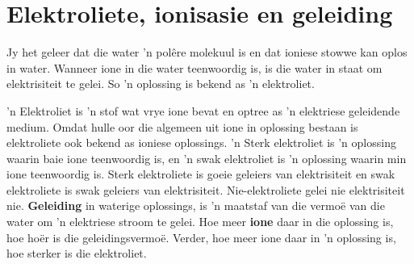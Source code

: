     \label{m38720*cid7}
            \section{Elektroliete, ionisasie en geleiding}
            \nopagebreak
      \label{m38720*id338608}Jy het geleer dat die water 'n polêre molekuul is en dat ioniese stowwe kan oplos in water.
Wanneer ione in die water teenwoordig is, is die water in staat om elektrisiteit te gelei. So  'n oplossing is bekend as 'n elektroliet.\par 
\label{m38720*fhsst!!!underscore!!!id635}
 { 'n Elektroliet is 'n stof wat vrye ione bevat en optree as 'n elektriese geleidende medium. Omdat hulle oor die algemeen uit ione in oplossing bestaan is elektroliete ook bekend as ioniese oplossings.  } 
 'n Sterk elektroliet is  'n oplossing waarin baie ione teenwoordig is, en 'n swak elektroliet is  'n oplossing waarin min ione teenwoordig is. Sterk elektroliete is goeie geleiers van elektrisiteit en swak elektroliete is swak geleiers van elektrisiteit. Nie-elektroliete gelei nie elektrisiteit nie.
\textbf{Geleiding} in waterige oplossings, is 'n maatstaf van die vermoë van die water om  'n elektriese stroom te gelei. Hoe meer \textbf{ione} daar in die oplossing is, hoe hoër is die geleidingsvermoë.  Verder, hoe meer ione daar in 'n oplossing is, hoe sterker is die elektroliet. 
      \label{m38720*uid56}
